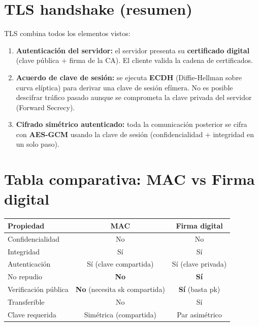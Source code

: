 \documentclass[11pt,a4paper]{article}
\begin{document}
\section{TLS handshake (resumen)}

TLS combina todos los elementos vistos:

\begin{enumerate}[leftmargin=1.6em,nosep]
  \item \textbf{Autenticación del servidor:} el servidor presenta su \textbf{certificado
  digital} (clave pública + firma de la CA). El cliente valida la cadena de
  certificados.
  \item \textbf{Acuerdo de clave de sesión:} se ejecuta \textbf{ECDH} (Diffie-Hellman
  sobre curva elíptica) para derivar una clave de sesión efímera. No es posible
  descifrar tráfico pasado aunque se comprometa la clave privada del servidor
  (Forward Secrecy).
  \item \textbf{Cifrado simétrico autenticado:} toda la comunicación posterior se
  cifra con \textbf{AES-GCM} usando la clave de sesión (confidencialidad +
  integridad en un solo paso).
\end{enumerate}

\section{Tabla comparativa: MAC vs Firma digital}

\begin{center}
\begin{tabular}{lcc}
\toprule
\textbf{Propiedad} & \textbf{MAC} & \textbf{Firma digital}\\
\midrule
Confidencialidad     & No & No \\
Integridad           & Sí & Sí \\
Autenticación        & Sí (clave compartida) & Sí (clave privada) \\
No repudio           & \textbf{No} & \textbf{Sí} \\
Verificación pública & \textbf{No} (necesita sk compartida) & \textbf{Sí} (basta pk) \\
Transferible         & No & Sí \\
Clave requerida      & Simétrica (compartida) & Par asimétrico \\
\bottomrule
\end{tabular}
\end{center}
\end{document}

